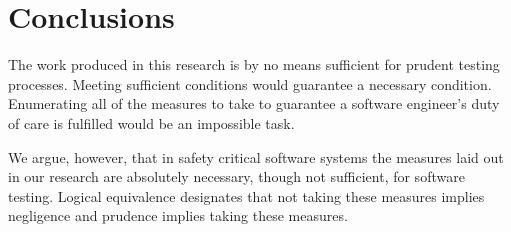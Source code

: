 \chapter{Conclusions}

The work produced in this research is by no means sufficient for prudent testing
processes. Meeting sufficient conditions would guarantee a necessary condition.
Enumerating all of the measures to take to guarantee a software engineer's duty
of care is fulfilled would be an impossible task.

We argue, however, that in safety critical software systems the measures laid
out in our research are absolutely necessary, though not sufficient, for
software testing. Logical equivalence designates that not taking these
measures implies negligence and prudence implies taking these measures.

